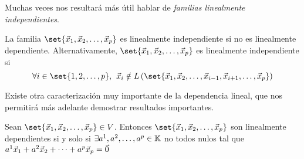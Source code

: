 \documentclass[../algebra_lineal.tex]{subfiles}
\begin{document}
Muchas veces nos resultará más útil hablar de \textit{familias linealmente independientes}.

\begin{definition}
    La familia $\set{\vlst{x}{p}}$ es linealmente independiente si no es linealmente dependiente. Alternativamente, $\set{\vlst{x}{p}}$ es linealmente independiente si
    \[\forall i \in \set{1, 2, \dots, p}, \spc \vx_i \notin \lspan{\set{\vlst{x}{i-1}, \vx_{i+1}, \dots, \vx_p}}
    \]
\end{definition}

Existe otra caracterización muy importante de la dependencia lineal, que nos permitirá más adelante demostrar resultados importantes.

\begin{proposition}
   Sean $\set{\vlst{x}{p}} \in V$. Entonces  $\set{\vlst{x}{p}}$ son linealmente dependientes si y solo si $\exists {a}^{1}, {a}^{2}, \dots, {a}^{p} \in \mathbb{K}$ no todos nulos tal que ${a}^{1}\vec{x}_{1}+{a}^{2}\vec{x}_{2}+\dots+{a}^{p}\vec{x}_{p} = \vec{0}$

\end{proposition}
\end{document}
